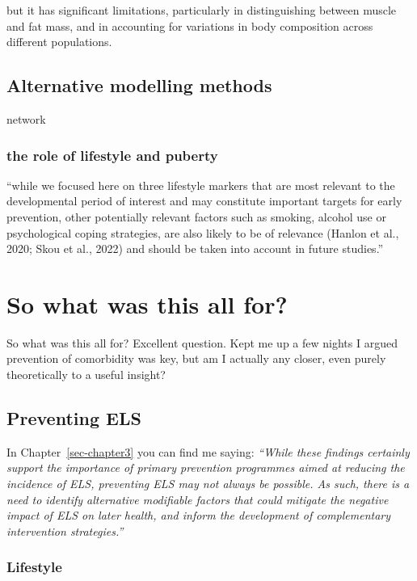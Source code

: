 \documentclass[
  letterpaper,
  DIV=11,
  numbers=noendperiod]{scrreport}
\begin{document}
but it has significant limitations, particularly in distinguishing
between muscle and fat mass, and in accounting for variations in body
composition across different populations.

\subsection{Alternative modelling
methods}\label{alternative-modelling-methods-1}

network

\subsubsection{the role of lifestyle and
puberty}\label{the-role-of-lifestyle-and-puberty}

``while we focused here on three lifestyle markers that are most
relevant to the developmental period of interest and may constitute
important targets for early prevention, other potentially relevant
factors such as smoking, alcohol use or psychological coping strategies,
are also likely to be of relevance (Hanlon et al., 2020; Skou et al.,
2022) and should be taken into account in future studies.''

\section{So what was this all for?}\label{so-what-was-this-all-for}

So what was this all for? Excellent question. Kept me up a few nights I
argued prevention of comorbidity was key, but am I actually any closer,
even purely theoretically to a useful insight?

\subsection{Preventing ELS}\label{preventing-els}

In Chapter~\ref{sec-chapter3} you can find me saying: \emph{``While
these findings certainly support the importance of primary prevention
programmes aimed at reducing the incidence of ELS, preventing ELS may
not always be possible. As such, there is a need to identify alternative
modifiable factors that could mitigate the negative impact of ELS on
later health, and inform the development of complementary intervention
strategies.''}

\subsubsection{Lifestyle}\label{lifestyle}
\end{document}

